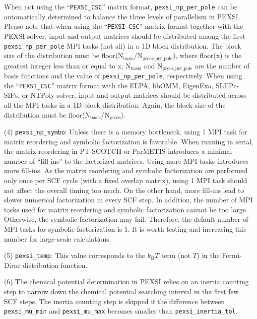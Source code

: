 \documentclass{report}
\begin{document}
When not using the ``\texttt{PEXSI\_CSC}'' matrix format, \texttt{pexsi\_np\_per\_pole} can be automatically determined to balance the three levels of parallelism in PEXSI. Please note that when using the ``\texttt{PEXSI\_CSC}'' matrix format together with the PEXSI solver, input and output matrices should be distributed among the first \texttt{pexsi\_np\_per\_pole} MPI tasks (not all) in a 1D block distribution. The block size of the distribution must be floor($\text{N}_\text{basis}$/$\text{N}_\text{procs\_per\_pole}$), where floor(x) is the greatest integer less than or equal to x, $\text{N}_\text{basis}$ and $\text{N}_\text{procs\_per\_pole}$ are the number of basis functions and the value of \texttt{pexsi\_np\_per\_pole}, respectively. When using the ``\texttt{PEXSI\_CSC}'' matrix format with the ELPA, libOMM, EigenExa, SLEPc-SIPs, or NTPoly solver, input and output matrices should be distributed across all the MPI tasks in a 1D block distribution. Again, the block size of the distribution must be floor($\text{N}_\text{basis}$/$\text{N}_\text{procs}$).

(4) \texttt{pexsi\_np\_symbo}: Unless there is a memory bottleneck, using 1 MPI task for matrix reordering and symbolic factorization is favorable. When running in serial, the matrix reordering in PT-SCOTCH or ParMETIS introduces a minimal number of ``fill-ins'' to the factorized matrices. Using more MPI tasks introduces more fill-ins. As the matrix reordering and symbolic factorization are performed only once per SCF cycle (with a fixed overlap matrix), using 1 MPI task should not affect the overall timing too much. On the other hand, more fill-ins lead to slower numerical factorization in every SCF step. In addition, the number of MPI tasks used for matrix reordering and symbolic factorization cannot be too large. Otherwise, the symbolic factorization may fail. Therefore, the default number of MPI tasks for symbolic factorization is 1. It is worth testing and increasing this number for large-scale calculations.

(5) \texttt{pexsi\_temp}: This value corresponds to the $k_\text{B} T$ term (not $T$) in the Fermi-Dirac distribution function.

(6) The chemical potential determination in PEXSI relies on an inertia counting step to narrow down the chemical potential searching interval in the first few SCF steps. The inertia counting step is skipped if the difference between \texttt{pexsi\_mu\_min} and \texttt{pexsi\_mu\_max} becomes smaller than \texttt{pexsi\_inertia\_tol}.
\end{document}

